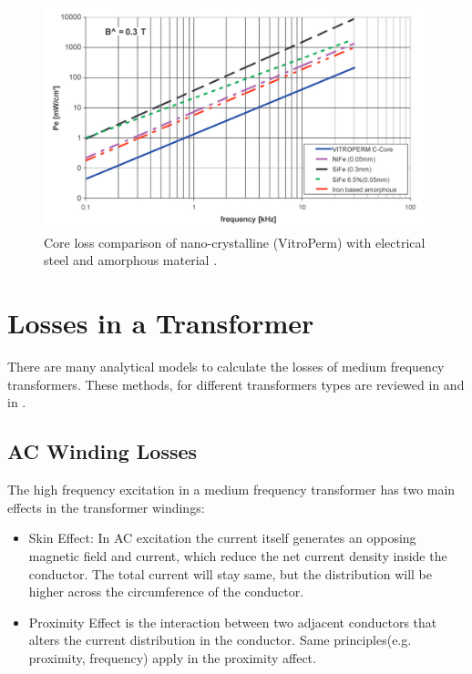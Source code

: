 \documentclass[a4paper, 11pt]{article} %
\begin{document}
\begin{figure}[]
  \centering
    \includegraphics[scale=0.3]{vitroperm_core_losses_vs_freq}
  \caption{Core loss comparison of nano-crystalline (VitroPerm) with electrical steel and amorphous material \cite{vitroterm_manual}.}
  \label{core-loss-log}
\end{figure}

\section{Losses in a Transformer}

There are many analytical models to calculate the losses of medium frequency transformers. These methods, for different transformers types are reviewed in \cite{Agheb2012} and in \cite{Villar2010}.

\subsection{AC Winding Losses}

The high frequency excitation in a medium frequency transformer has two main effects in the transformer windings:
\begin{itemize}
  \item Skin Effect: In AC excitation the current itself generates an opposing magnetic field and current, which reduce the net current density inside the conductor. The total current will stay same, but the distribution will be higher across the circumference of the conductor.
  \item Proximity Effect is the interaction between two adjacent conductors that alters the current distribution in the conductor. Same principles(e.g. proximity, frequency) apply in the proximity affect.
\end{itemize}
\end{document}
